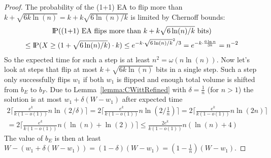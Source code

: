 \begin{proof}
    




    The probability of the (1+1) EA to flip more than $k+\sqrt{6k\ln(n)}=k+k\sqrt{6\ln(n)/k}$ is limited by Chernoff bounds:
    \begin{gather}
        \nonumber \text{I\kern-0.15em P}(\text{(1+1) EA flips more than }k+k\sqrt{6\ln(n)/k}\text{ bits})\\ \nonumber
        \le\text{I\kern-0.15em P}(X\ge (1+\sqrt{6\ln(n)/k})\cdot k)
        \le e^{-k\cdot{\sqrt{6\ln(n)/k}}^2/3}
        = e^{-k\cdot \frac{6\ln n}{3k}}
        = n^{-2}
    \end{gather}
    So the expected time for such a step is at least \(n^2=\omega(n\ln(n))\).
    Now let's look at steps that flip at most $k+\sqrt{6k\ln(n)}$ bits in a single step.
    Such a step only successfully flips $w_1$ if both $w_1$ is flipped and enough total volume is shifted from $b_E$ to $b_F$.
    Due to Lemma~\ref{lemma:CWittRefined} with $\delta=\frac{1}{n}$ (for $n>1$) the solution is at most $w_1+\delta(W-w_1)$ after expected time
    \begin{gather}\nonumber
        2\lceil\frac{e^k}{k(1-o(1))}n\ln(2/\delta)\rceil
        =2\lceil\frac{e^k}{k(1-o(1))}n\ln(2/\frac{1}{n})\rceil
        =2\lceil\frac{e^k}{k(1-o(1))}n\ln(2n)\rceil \\ \nonumber
        =2\lceil\frac{e^k}{k(1-o(1))}n(\ln(n)+\ln(2))\rceil
        \le\frac{2e^k}{k(1-o(1))}n(\ln(n)+4)
    \end{gather}
    The value of $b_E$ is then at least \(W-(w_1+\delta(W-w_1))=(1-\delta)(W-w_1)=(1-\frac{1}{n})(W-w_1)\).


\end{proof}
